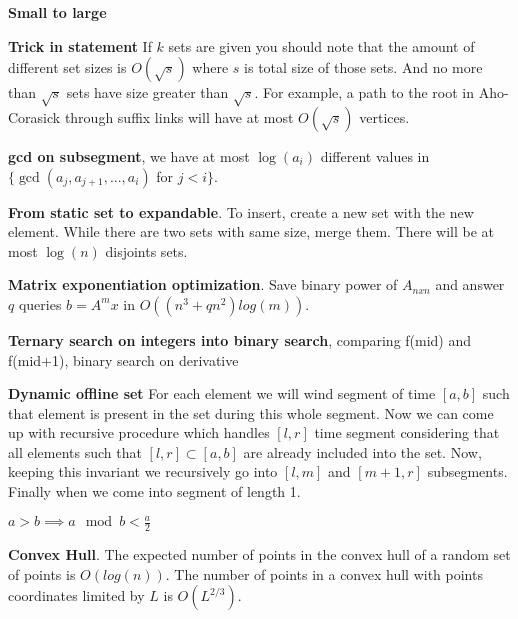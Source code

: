\documentclass[a4paper,10pt,oneside]{article}
\begin{document}
\begin{multicols}{2}
\textbf{Small to large}

\textbf{Trick in statement} If $k$ sets are given you should note that the amount of different set sizes is $O(\sqrt{s})$ where $s$ is total size of those sets. And no more than $\sqrt{s}$ sets have size greater than $\sqrt{s}$. For example, a path to the root in Aho-Corasick through suffix links will have at most $O(\sqrt{s})$ vertices.

\textbf{gcd on subsegment}, we have at most $\log(a_i)$ different values in $\{\gcd(a_j, a_{j+1}, ..., a_i)$ for $j < i\}$.

\textbf{From static set to expandable}. To insert, create a new set with the new element. While there are two sets with same size, merge them. There will be at most $\log(n)$ disjoints sets.

\textbf{Matrix exponentiation optimization}. Save binary power of $A_{nxn}$ and answer $q$ queries $b = A^mx$ in $O((n^3 + qn^2)log(m))$.

\textbf{Ternary search on integers into binary search}, comparing f(mid) and f(mid+1), binary search on derivative

\textbf{Dynamic offline set} For each element we will wind segment of time $[a, b]$ such that element is present in the set during this whole segment. Now we can come up with recursive procedure which handles $[l, r]$ time segment considering that all elements such that $[l, r] \subset [a, b]$ are already included into the set. Now, keeping this invariant we recursively go into $[l, m]$ and $[m+1, r]$ subsegments. Finally when we come into segment of length 1.

$a > b \implies a \mod b < \frac{a}{2}$

\textbf{Convex Hull}. The expected number of points in the convex hull of a random set of points is $O(log(n))$. The number of points in a convex hull with points coordinates limited by $L$ is $O(L^{2/3})$.

\end{multicols}
\end{document}

